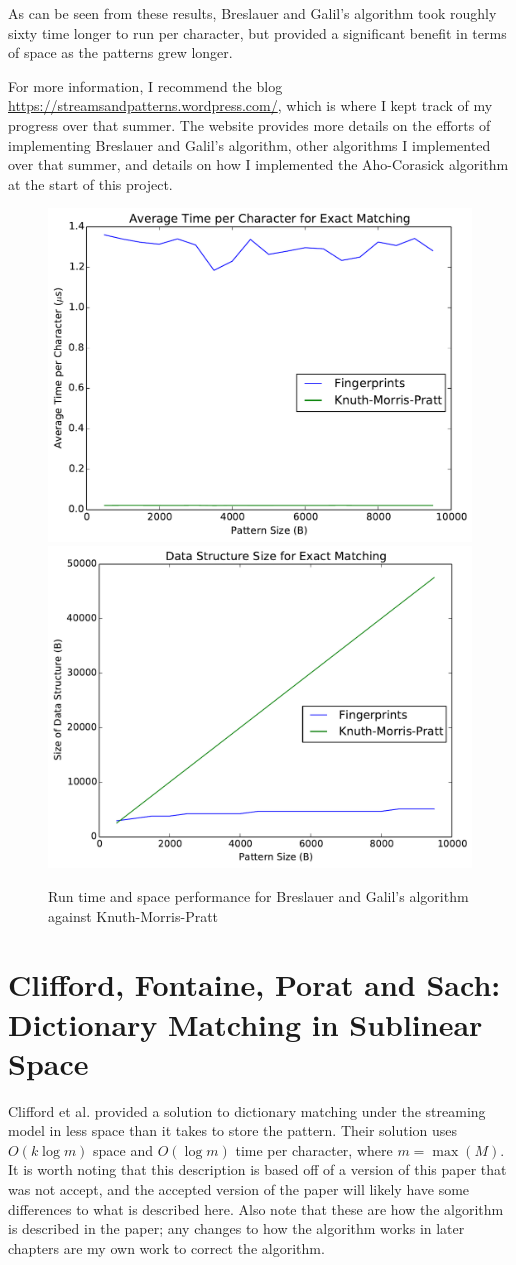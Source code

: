 \documentclass[ %
                    author={Dominic Joseph Moylett},
                    degree={MEng},
                     title={Dictionary Matching with Fingerprints},
                  subtitle={An Empirical Analysis},
                      type={Research},
                      year={2014} ]{dissertation}
\begin{document}
As can be seen from these results, Breslauer and Galil's algorithm took roughly sixty time longer to run per character, but provided a significant benefit in terms of space as the patterns grew longer.

For more information, I recommend the blog \url{https://streamsandpatterns.wordpress.com/}, which is where I kept track of my progress over that summer. The website provides more details on the efforts of implementing Breslauer and Galil's algorithm, other algorithms I implemented over that summer, and details on how I implemented the Aho-Corasick algorithm at the start of this project.

\begin{figure}[t]
\begin{center}
  \includegraphics[width=0.5\linewidth]{summer_run_time}\includegraphics[width=0.5\linewidth]{summer_size}
\end{center}
\caption{Run time and space performance for Breslauer and Galil's algorithm against Knuth-Morris-Pratt}
\label{fig:summer-results}
\end{figure}

\section{Clifford, Fontaine, Porat and Sach: Dictionary Matching in Sublinear Space}
\label{sec:theory-clifford}

Clifford et al.\cite{clifford:dict-matching} provided a solution to dictionary matching under the streaming model in less space than it takes to store the pattern. Their solution uses $O(k\log m)$ space and $O(\log m)$ time per character, where $m = \max(M)$. It is worth noting that this description is based off of a version of this paper that was not accept, and the accepted version of the paper will likely have some differences to what is described here. Also note that these are how the algorithm is described in the paper; any changes to how the algorithm works in later chapters are my own work to correct the algorithm.
\end{document}
